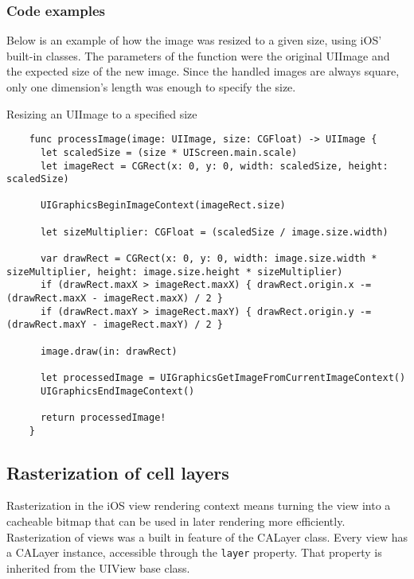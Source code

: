 \documentclass[a4paper,12pt]{article}
\begin{document}
\subsubsection{Code examples}
Below is an example of how the image was resized to a given size, using iOS' built-in classes. The parameters of the function were the original UIImage and the expected size of the new image. Since the handled images are always square, only one dimension's length was enough to specify the size.
\begin{listing}[H]
  \caption{Resizing an UIImage to a specified size}
  \begin{verbatim}
    func processImage(image: UIImage, size: CGFloat) -> UIImage {
      let scaledSize = (size * UIScreen.main.scale)
      let imageRect = CGRect(x: 0, y: 0, width: scaledSize, height: scaledSize)

      UIGraphicsBeginImageContext(imageRect.size)

      let sizeMultiplier: CGFloat = (scaledSize / image.size.width)

      var drawRect = CGRect(x: 0, y: 0, width: image.size.width * sizeMultiplier, height: image.size.height * sizeMultiplier)
      if (drawRect.maxX > imageRect.maxX) { drawRect.origin.x -= (drawRect.maxX - imageRect.maxX) / 2 }
      if (drawRect.maxY > imageRect.maxY) { drawRect.origin.y -= (drawRect.maxY - imageRect.maxY) / 2 }

      image.draw(in: drawRect)

      let processedImage = UIGraphicsGetImageFromCurrentImageContext()
      UIGraphicsEndImageContext()

      return processedImage!
    }
  \end{verbatim}
\end{listing}


\subsection{Rasterization of cell layers}
Rasterization in the iOS view rendering context means turning the view into a cacheable bitmap that can be used in later rendering more efficiently. Rasterization of views was a built in feature of the CALayer class. Every view has a CALayer instance, accessible through the \texttt{layer} property. That property is inherited from the UIView base class.
\end{document}
